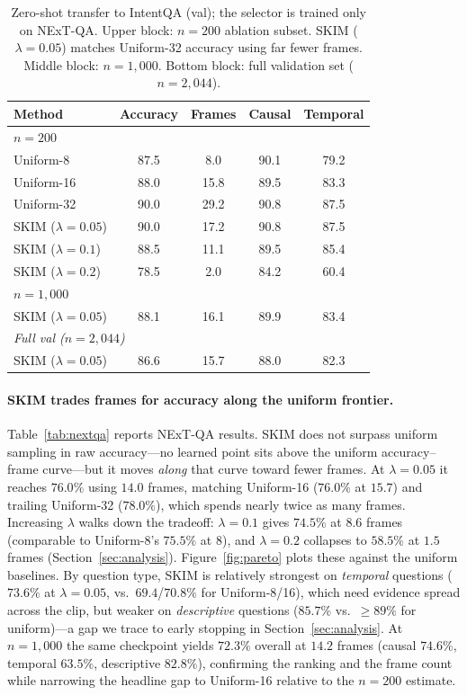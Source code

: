 \documentclass{article}
\begin{document}
\begin{table}[t]
  \caption{Zero-shot transfer to IntentQA (val); the selector is trained
    only on NExT-QA. Upper block: $n{=}200$ ablation subset. SKIM
    ($\lambda{=}0.05$) matches Uniform-32 accuracy using far fewer frames.
    Middle block: $n{=}1{,}000$. Bottom block: full validation set
    ($n{=}2{,}044$).}
  \label{tab:intentqa}
  \centering
  \begin{tabular}{lcccc}
    \toprule
    Method & Accuracy & Frames & Causal & Temporal \\
    \midrule
    \multicolumn{5}{l}{\emph{$n{=}200$}} \\
    Uniform-8  & 87.5 & 8.0  & 90.1 & 79.2 \\
    Uniform-16 & 88.0 & 15.8 & 89.5 & 83.3 \\
    Uniform-32 & 90.0 & 29.2 & 90.8 & 87.5 \\
    \midrule
    SKIM ($\lambda{=}0.05$) & 90.0 & 17.2 & 90.8 & 87.5 \\
    SKIM ($\lambda{=}0.1$)  & 88.5 & 11.1 & 89.5 & 85.4 \\
    SKIM ($\lambda{=}0.2$)  & 78.5 & 2.0  & 84.2 & 60.4 \\
    \midrule
    \multicolumn{5}{l}{\emph{$n{=}1{,}000$}} \\
    SKIM ($\lambda{=}0.05$) & 88.1 & 16.1 & 89.9 & 83.4 \\
    \midrule
    \multicolumn{5}{l}{\emph{Full val ($n{=}2{,}044$)}} \\
    SKIM ($\lambda{=}0.05$) & 86.6 & 15.7 & 88.0 & 82.3 \\
    \bottomrule
  \end{tabular}
\end{table}

\paragraph{SKIM trades frames for accuracy along the uniform frontier.}
Table~\ref{tab:nextqa} reports NExT-QA results. SKIM does not surpass uniform sampling
in raw accuracy---no learned point sits above the uniform accuracy--frame curve---but
it moves \emph{along} that curve toward fewer frames. At $\lambda{=}0.05$ it reaches
$76.0\%$ using $14.0$ frames, matching Uniform-16 ($76.0\%$ at $15.7$) and trailing
Uniform-32 ($78.0\%$), which spends nearly twice as many frames. Increasing $\lambda$
walks down the tradeoff: $\lambda{=}0.1$ gives $74.5\%$ at $8.6$ frames (comparable to
Uniform-8's $75.5\%$ at $8$), and $\lambda{=}0.2$ collapses to $58.5\%$ at $1.5$ frames
(Section~\ref{sec:analysis}). Figure~\ref{fig:pareto} plots these against the uniform
baselines. By question type, SKIM is relatively strongest on \emph{temporal} questions
($73.6\%$ at $\lambda{=}0.05$, vs.\ $69.4$/$70.8\%$ for Uniform-8/16), which need
evidence spread across the clip, but weaker on \emph{descriptive} questions ($85.7\%$
vs.\ ${\geq}89\%$ for uniform)---a gap we trace to early stopping in
Section~\ref{sec:analysis}. At $n{=}1{,}000$ the same checkpoint yields $72.3\%$
overall at $14.2$ frames (causal $74.6\%$, temporal $63.5\%$, descriptive $82.8\%$),
confirming the ranking and the frame count while narrowing the headline gap to
Uniform-16 relative to the $n{=}200$ estimate.
\end{document}
